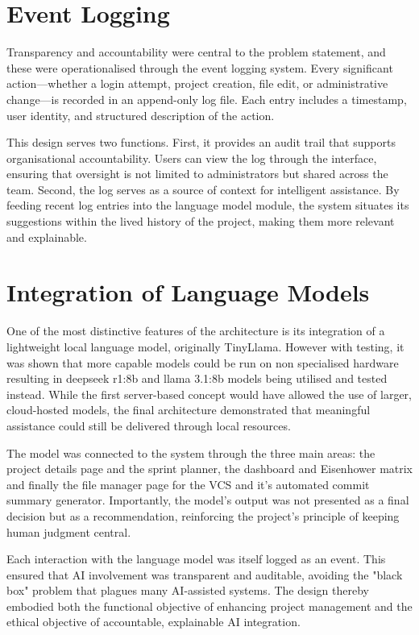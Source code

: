 \documentclass{report}
\begin{document}
\section{Event Logging}

Transparency and accountability were central to the problem statement, and these were operationalised through the event logging system. 
Every significant action—whether a login attempt, project creation, file edit, or administrative change—is recorded in an append-only log file. 
Each entry includes a timestamp, user identity, and structured description of the action.

This design serves two functions. 
First, it provides an audit trail that supports organisational accountability. 
Users can view the log through the interface, ensuring that oversight is not limited to administrators but shared across the team. 
Second, the log serves as a source of context for intelligent assistance. 
By feeding recent log entries into the language model module, the system situates its suggestions within the lived history of the project, making them more relevant and explainable.

\section{Integration of Language Models}

One of the most distinctive features of the architecture is its integration of a lightweight local language model, originally TinyLlama.
However with testing, it was shown that more capable models could be run on non specialised hardware resulting in deepseek r1:8b and llama 3.1:8b models being utilised and tested instead.
While the first server-based concept would have allowed the use of larger, cloud-hosted models, the final architecture demonstrated that meaningful assistance could still be delivered through local resources.

The model was connected to the system through the three main areas: the project details page and the sprint planner, the dashboard and Eisenhower matrix and finally the file manager page for the VCS and it's automated commit summary generator. 
Importantly, the model's output was not presented as a final decision but as a recommendation, reinforcing the project's principle of keeping human judgment central.

Each interaction with the language model was itself logged as an event. 
This ensured that AI involvement was transparent and auditable, avoiding the "black box" problem that plagues many AI-assisted systems. 
The design thereby embodied both the functional objective of enhancing project management and the ethical objective of accountable, explainable AI integration.
\end{document}
